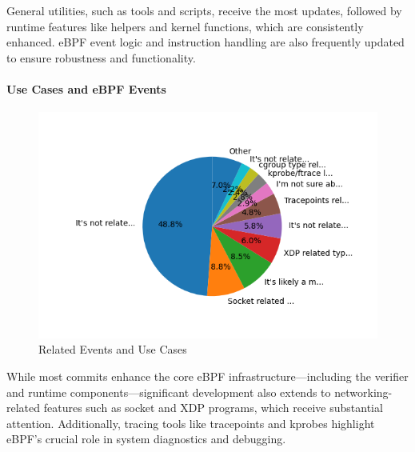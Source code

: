 General utilities, such as tools and scripts, receive the most updates, followed by runtime features like helpers and kernel functions, which are consistently enhanced. eBPF event logic and instruction handling are also frequently updated to ensure robustness and functionality.

\paragraph{Use Cases and eBPF Events}

\begin{figure}[ht]
    \centering
    \includegraphics[width=\linewidth]{feature-analysis/commit_pie_chart_usecases_or_submodule_events.png}
    \caption{Related Events and Use Cases}
    \label{fig:commit_pie_chart_usecases_or_submodule_events}
\end{figure}

While most commits enhance the core eBPF infrastructure—including the verifier and runtime components—significant development also extends to networking-related features such as socket and XDP programs, which receive substantial attention. Additionally, tracing tools like tracepoints and kprobes highlight eBPF's crucial role in system diagnostics and debugging.